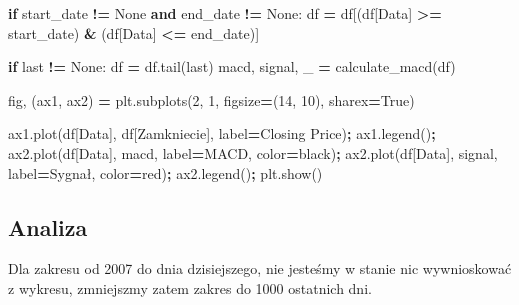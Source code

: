 \documentclass[
]{article}
\newenvironment{Shaded}{\begin{snugshade}}{\end{snugshade}}
\newcommand{\ControlFlowTok}[1]{\textcolor[rgb]{0.13,0.29,0.53}{\textbf{#1}}}
\newcommand{\DecValTok}[1]{\textcolor[rgb]{0.00,0.00,0.81}{#1}}
\newcommand{\KeywordTok}[1]{\textcolor[rgb]{0.13,0.29,0.53}{\textbf{#1}}}
\newcommand{\NormalTok}[1]{#1}
\newcommand{\OperatorTok}[1]{\textcolor[rgb]{0.81,0.36,0.00}{\textbf{#1}}}
\newcommand{\StringTok}[1]{\textcolor[rgb]{0.31,0.60,0.02}{#1}}
\newcommand{\VariableTok}[1]{\textcolor[rgb]{0.00,0.00,0.00}{#1}}
\begin{document}
\begin{Shaded}
\begin{Highlighting}[]
    \ControlFlowTok{if}\NormalTok{ start\_date }\OperatorTok{!=} \VariableTok{None} \KeywordTok{and}\NormalTok{ end\_date }\OperatorTok{!=} \VariableTok{None}\NormalTok{:}
\NormalTok{        df }\OperatorTok{=}\NormalTok{ df[(df[}\StringTok{\textquotesingle{}Data\textquotesingle{}}\NormalTok{] }\OperatorTok{\textgreater{}=}\NormalTok{ start\_date) }\OperatorTok{\&}\NormalTok{ (df[}\StringTok{\textquotesingle{}Data\textquotesingle{}}\NormalTok{] }\OperatorTok{\textless{}=}\NormalTok{ end\_date)]}

    \ControlFlowTok{if}\NormalTok{ last }\OperatorTok{!=} \VariableTok{None}\NormalTok{:}
\NormalTok{        df }\OperatorTok{=}\NormalTok{ df.tail(last)}
\NormalTok{    macd, signal, \_ }\OperatorTok{=}\NormalTok{ calculate\_macd(df)}

\NormalTok{    fig, (ax1, ax2) }\OperatorTok{=}\NormalTok{ plt.subplots(}\DecValTok{2}\NormalTok{, }\DecValTok{1}\NormalTok{, figsize}\OperatorTok{=}\NormalTok{(}\DecValTok{14}\NormalTok{, }\DecValTok{10}\NormalTok{), sharex}\OperatorTok{=}\VariableTok{True}\NormalTok{)}

\NormalTok{    ax1.plot(df[}\StringTok{\textquotesingle{}Data\textquotesingle{}}\NormalTok{], df[}\StringTok{\textquotesingle{}Zamkniecie\textquotesingle{}}\NormalTok{], label}\OperatorTok{=}\StringTok{\textquotesingle{}Closing Price\textquotesingle{}}\NormalTok{)}\OperatorTok{;}
\NormalTok{    ax1.legend()}\OperatorTok{;}
\NormalTok{    ax2.plot(df[}\StringTok{\textquotesingle{}Data\textquotesingle{}}\NormalTok{], macd, label}\OperatorTok{=}\StringTok{\textquotesingle{}MACD\textquotesingle{}}\NormalTok{, color}\OperatorTok{=}\StringTok{\textquotesingle{}black\textquotesingle{}}\NormalTok{)}\OperatorTok{;}
\NormalTok{    ax2.plot(df[}\StringTok{\textquotesingle{}Data\textquotesingle{}}\NormalTok{], signal, label}\OperatorTok{=}\StringTok{\textquotesingle{}Sygnał\textquotesingle{}}\NormalTok{, color}\OperatorTok{=}\StringTok{\textquotesingle{}red\textquotesingle{}}\NormalTok{)}\OperatorTok{;}
\NormalTok{    ax2.legend()}\OperatorTok{;}
\NormalTok{    plt.show()}
\end{Highlighting}
\end{Shaded}

\subsection{Analiza}\label{analiza}

Dla zakresu od 2007 do dnia dzisiejszego, nie jesteśmy w stanie nic
wywnioskować z wykresu, zmniejszmy zatem zakres do 1000 ostatnich dni.
\end{document}
